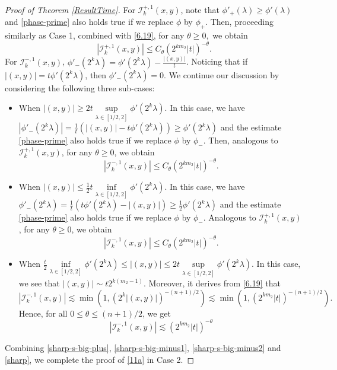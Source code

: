 \documentclass[a4paper,11pt, reqno]{amsart}
\numberwithin{equation}{section}
\theoremstyle{plain}
\theoremstyle{definition}
\theoremstyle{remark}
\begin{document}
\begin{proof}[Proof of Theorem \ref{ResultTime}]
For $\mathcal{I}_k^{+,1}(x,y)$, note that $\phi'_+(\lambda)\geq \phi'(\lambda)$ and \eqref{phase-prime} also holds true if we replace $\phi$ by $\phi_+$. Then, proceeding similarly as Case 1, combined with \eqref{6.19},  for any 
 $\theta\geq0,$ we obtain
\begin{equation}\label{sharp-s-big-plus}
|\mathcal{I}_k^{+,1}(x,y)|\leq C_\theta\left(2^{km_2}|t|\right)^{-\theta}.
 \end{equation}
 For $\mathcal{I}_k^{-,1}(x,y)$, $\phi'_-(2^k\lambda)=\phi'(2^k\lambda)-\frac{|(x,y)|}{t}$. Noticing that if $|(x,y)|=t\phi'(2^k\lambda)$, then $\phi'_-(2^k\lambda)=0$. We continue our discussion by considering the following three sub-cases:
\begin{itemize}
\item When $|(x,y)|\geq 2t\sup\limits_{\lambda\in[1/2,2]}\phi'(2^k\lambda)$.
 In this case, we have $|\phi'_-(2^k\lambda)|=\frac{1}{t}\left(|(x,y)|-t\phi'(2^k\lambda)\right)\geq \phi'(2^k\lambda)$ and  the estimate 
 \eqref{phase-prime} also holds true if we replace $\phi$ by $\phi_-$. Then, analogous to $\mathcal{I}_k^{+,1}(x,y)$, for any $\theta\geq0$, we obtain
\begin{equation}\label{sharp-s-big-minus1}
|\mathcal{I}_k^{-,1}(x,y)|\leq C_\theta\left(2^{km_2}|t|\right)^{-\theta}.
 \end{equation}
\item  When $|(x,y)|\leq \frac{1}{2}t\inf\limits_{\lambda\in[1/2,2]}\phi'(2^k\lambda)$. In this case, we have $\phi'_-(2^k\lambda)=\frac{1}{t}\left(t\phi'(2^k\lambda)-|(x,y)|\right)\geq \frac{1}{2}\phi'(2^k\lambda)$ and the estimate \eqref{phase-prime} also holds true if we replace $\phi$ by $\phi_-$. Analogous to $\mathcal{I}_k^{+,1}(x,y)$, for any $\theta\geq0$, we obtain
\begin{equation}\label{sharp-s-big-minus2}
|\mathcal{I}_k^{-,1}(x,y)|\leq C_\theta\left(2^{km_2}|t|\right)^{-\theta}.
 \end{equation}
\item When $\frac{t}{2}\inf\limits_{\lambda\in[1/2,2]}\phi'(2^k\lambda)\leq |(x,y)|\leq 2t\sup\limits_{\lambda\in[1/2,2]}\phi'(2^k\lambda)$. In this case, we see that $|(x,y)|\sim t2^{k(m_2-1)}$. Moreover, it derives from \eqref{6.19} that
 \begin{equation}\label{sharp-s-big-minus3}
  |\mathcal{I}_k^{-,1}(x,y)|\lesssim \min\left(1,\left(2^k|(x,y)|\right)^{-(n+1)/2}\right)\lesssim \min\left(1,\left(2^{km_2}|t|\right)^{-(n+1)/2}\right).
 \end{equation}
Hence, for all $0\leq\theta\leq(n+1)/2$, we get
\begin{equation}\label{sharp}
|\mathcal{I}_k^{-,1}(x,y)|\lesssim \left(2^{km_2}|t|\right)^{-\theta}
 \end{equation}
 \end{itemize}
Combining \eqref{sharp-s-big-plus}, \eqref{sharp-s-big-minus1}, \eqref{sharp-s-big-minus2} and \eqref{sharp}, we complete the proof of \eqref{11a} in Case 2.
 

\end{proof}
\end{document}
